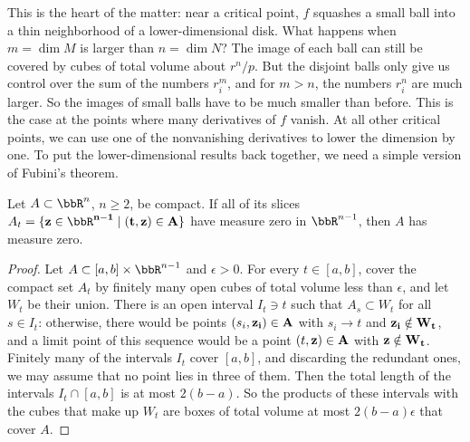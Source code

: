 This is the heart of the matter: near a critical point, $f$ squashes a small ball into a thin neighborhood of a lower-dimensional disk. What happens when $m=\dim M$ is larger than $n=\dim N$? The image of each ball can still be covered by cubes of total volume about $r^n/p$. But the disjoint balls only give us control over the sum of the numbers $r_i^m$, and for $m>n$, the numbers $r_i^n$ are much larger. So the images of small balls have to be much smaller than before. This is the case at the points where many derivatives of $f$ vanish. At all other critical points, we can use one of the nonvanishing derivatives to lower the dimension by one. To put the lower-dimensional results back together, we need a simple version of Fubini's theorem.

\begin{lem}\label{lem Fubini measure zero}
    Let $A\subset\bbR^n$, $n\geq2$, be compact. If all of its slices $A_t=\{\bf{z}\in\bbR^{n-1}\mid(t,\bf{z})\in A\}$ have measure zero in $\bbR^{n-1}$, then $A$ has measure zero.
\end{lem}
\begin{proof}
    Let $A\subset[a,b]\times\bbR^{n-1}$ and $\epsilon>0$. For every $t\in[a,b]$, cover the compact set $A_t$ by finitely many open cubes of total volume less than $\epsilon$, and let $W_t$ be their union. There is an open interval $I_t\ni t$ such that $A_s\subset W_t$ for all $s\in I_t$: otherwise, there would be points $(s_i,\bf{z}_i)\in A$ with $s_i\to t$ and $\bf{z}_i\notin W_t$, and a limit point of this sequence would be a point $(t,\bf{z})\in A$ with $\bf{z}\notin W_t$. Finitely many of the intervals $I_t$ cover $[a,b]$, and discarding the redundant ones, we may assume that no point lies in three of them. Then the total length of the intervals $I_t\cap[a,b]$ is at most $2(b-a)$. So the products of these intervals with the cubes that make up $W_t$ are boxes of total volume at most $2(b-a)\epsilon$ that cover $A$.
\end{proof}


